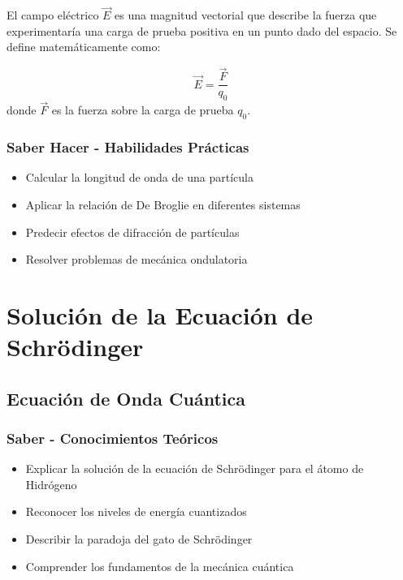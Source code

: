 \documentclass[12pt,a4paper,twoside]{book}
\begin{document}
	El campo eléctrico $\vec{E}$ es una magnitud vectorial que describe la fuerza que experimentaría una carga de prueba positiva en un punto dado del espacio. Se define matemáticamente como:
	
	\begin{ecuacionbox}
		$$\vec{E} = \frac{\vec{F}}{q_0}$$
		donde $\vec{F}$ es la fuerza sobre la carga de prueba $q_0$.
	\end{ecuacionbox}
	
	\subsection{Saber Hacer - Habilidades Prácticas}
	\begin{hacerbox}
		\begin{itemize}
			\item Calcular la longitud de onda de una partícula
			\item Aplicar la relación de De Broglie en diferentes sistemas
			\item Predecir efectos de difracción de partículas
			\item Resolver problemas de mecánica ondulatoria
		\end{itemize}
	\end{hacerbox}
	
	\chapter{Solución de la Ecuación de Schrödinger}
	\label{chap:schrodinger}
	
	\section{Ecuación de Onda Cuántica}
	\label{sec:ecuacion_onda}
	
	\subsection{Saber - Conocimientos Teóricos}
	\begin{saberbox}
		\begin{itemize}
			\item Explicar la solución de la ecuación de Schrödinger para el átomo de Hidrógeno
			\item Reconocer los niveles de energía cuantizados
			\item Describir la paradoja del gato de Schrödinger
			\item Comprender los fundamentos de la mecánica cuántica
		\end{itemize}
	\end{saberbox}
	
\end{document}
